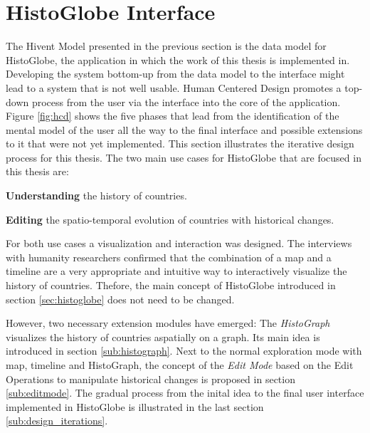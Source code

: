 
\section{HistoGlobe Interface} %
\label{sec:histoglobe_interface}

The Hivent Model presented in the previous section is the data model for HistoGlobe, the application in which the work of this thesis is implemented in. Developing the system bottom-up from the data model to the interface might lead to a system that is not well usable. Human Centered Design promotes a top-down process from the user via the interface into the core of the application. Figure \ref{fig:hcd} shows the five phases that lead from the identification of the mental model of the user all the way to the final interface and possible extensions to it that were not yet implemented. This section illustrates the iterative design process for this thesis. The two main use cases for HistoGlobe that are focused in this thesis are:

\begin{compactenum}
  \item \textbf{Understanding} the history of countries.
  \item \textbf{Editing} the spatio-temporal evolution of countries with historical changes.
\end{compactenum}

For both use cases a visualization and interaction was designed. The interviews with humanity researchers confirmed that the combination of a map and a timeline are a very appropriate and intuitive way to interactively visualize the history of countries. Thefore, the main concept of HistoGlobe introduced in section \ref{sec:histoglobe} does not need to be changed.

However, two necessary extension modules have emerged: The \emph{HistoGraph} visualizes the history of countries aspatially on a graph. Its main idea is introduced in section \ref{sub:histograph}. Next to the normal exploration mode with map, timeline and HistoGraph, the concept of the \emph{Edit Mode} based on the Edit Operations to manipulate historical changes is proposed in section \ref{sub:editmode}. The gradual process from the inital idea to the final user interface implemented in HistoGlobe is illustrated in the last section \ref{sub:design_iterations}.

